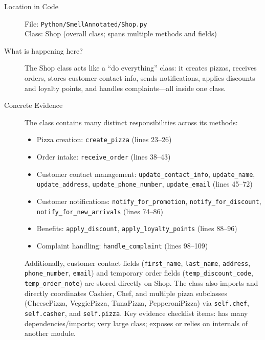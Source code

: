 \documentclass[12pt]{article}
\begin{document}
\begin{description}
    \item[Location in Code]
        File: \texttt{Python/SmellAnnotated/Shop.py} \\
        Class: Shop (overall class; spans multiple methods and fields)

    \item[What is happening here?]
        The Shop class acts like a ``do everything'' class: it creates pizzas, receives orders,
        stores customer contact info, sends notifications, applies discounts and loyalty points,
        and handles complaints---all inside one class.

    \item[Concrete Evidence]
        The class contains many distinct responsibilities across its methods:
        \begin{itemize}
            \item Pizza creation: \texttt{create\_pizza} (lines 23--26)
            \item Order intake: \texttt{receive\_order} (lines 38--43)
            \item Customer contact management: \texttt{update\_contact\_info}, \texttt{update\_name},
                  \texttt{update\_address}, \texttt{update\_phone\_number}, \texttt{update\_email} (lines 45--72)
            \item Customer notifications: \texttt{notify\_for\_promotion}, \texttt{notify\_for\_discount}, \\
                  \texttt{notify\_for\_new\_arrivals} (lines 74--86)
            \item Benefits: \texttt{apply\_discount}, \texttt{apply\_loyalty\_points} (lines 88--96)
            \item Complaint handling: \texttt{handle\_complaint} (lines 98--109)
        \end{itemize}
        Additionally, customer contact fields (\texttt{first\_name}, \texttt{last\_name}, \texttt{address}, \\
        \texttt{phone\_number}, \texttt{email}) and temporary order fields (\texttt{temp\_discount\_code},
        \texttt{temp\_order\_note}) are stored directly on Shop. The class also imports and directly
        coordinates Cashier, Chef, and multiple pizza subclasses (CheesePizza, VeggiePizza,
        TunaPizza, PepperoniPizza) via \texttt{self.chef}, \texttt{self.casher}, and \texttt{self.pizza}.
        Key evidence checklist items: has many dependencies/imports; very large class; exposes or
        relies on internals of another module.


\end{description}
\end{document}
